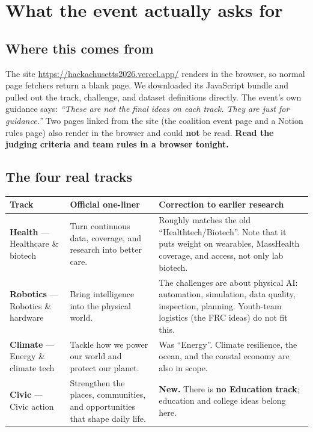 \documentclass[11pt]{article}
\newcommand{\tagC}{\textcolor{civic}{\textbf{Civic}}}
\newcommand{\tagR}{\textcolor{robo}{\textbf{Robotics}}}
\newcommand{\tagE}{\textcolor{clim}{\textbf{Climate}}}
\newcommand{\tagH}{\textcolor{health}{\textbf{Health}}}
\begin{document}
\section{What the event actually asks for}

\subsection{Where this comes from}
The site \url{https://hackachusetts2026.vercel.app/} renders in the browser, so normal
page fetchers return a blank page. We downloaded its JavaScript bundle and pulled out the
track, challenge, and dataset definitions directly. The event's own guidance says:
\emph{``These are not the final ideas on each track. They are just for guidance.''}
Two pages linked from the site (the coalition event page and a Notion rules page) also render
in the browser and could \textbf{not} be read. \textbf{Read the judging criteria and team
rules in a browser tonight.}

\subsection{The four real tracks}
\begin{longtable}{@{}L{3.4cm} L{5.2cm} L{6.4cm}@{}}
\toprule
\textbf{Track} & \textbf{Official one-liner} & \textbf{Correction to earlier research}\\
\midrule
\endhead
\tagH{} --- Healthcare \& biotech & Turn continuous data, coverage, and research into better care. & Roughly matches the old ``Healthtech/Biotech''. Note that it puts weight on wearables, MassHealth coverage, and access, not only lab biotech.\\
\tagR{} --- Robotics \& hardware & Bring intelligence into the physical world. & The challenges are about physical AI: automation, simulation, data quality, inspection, planning. Youth-team logistics (the FRC ideas) do not fit this.\\
\tagE{} --- Energy \& climate tech & Tackle how we power our world and protect our planet. & Was ``Energy''. Climate resilience, the ocean, and the coastal economy are also in scope.\\
\tagC{} --- Civic action & Strengthen the places, communities, and opportunities that shape daily life. & \textbf{New.} There is \textbf{no Education track}; education and college ideas belong here.\\
\bottomrule
\end{longtable}
\end{document}
